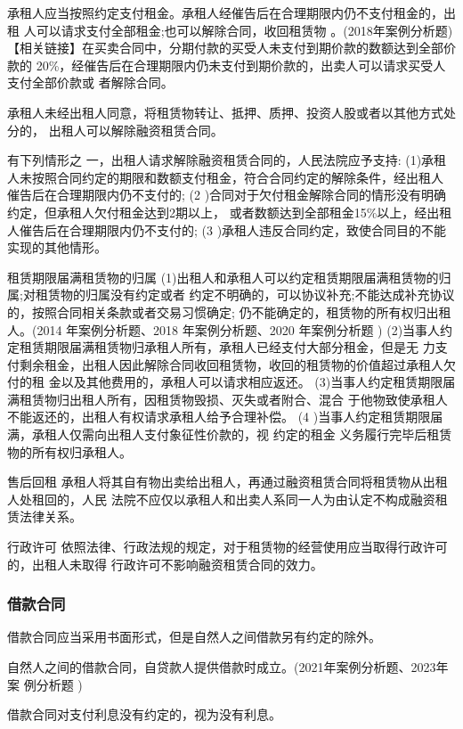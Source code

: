 \documentclass[UTF8,12pt]{ctexart}
\numberwithin{equation}{section} %
\numberwithin{figure}{section}
\numberwithin{table}{section}
\begin{document}
	承租人应当按照约定支付租金。承租人经催告后在合理期限内仍不支付租金的，出租 人可以请求支付全部租金;也可以解除合同，收回租赁物 。(2018年案例分析题)
	【相关链接】在买卖合同中，分期付款的买受人未支付到期价款的数额达到全部价款的 20\%，经催告后在合理期限内仍未支付到期价款的，出卖人可以请求买受人支付全部价款或 者解除合同。
	
	
	承租人未经出租人同意，将租赁物转让、抵押、质押、投资人股或者以其他方式处分的， 出租人可以解除融资租赁合同。
	
	有下列情形之 一，出租人请求解除融资租赁合同的，人民法院应予支持: (1)承租人未按照合同约定的期限和数额支付租金，符合合同约定的解除条件，经出租人 催告后在合理期限内仍不支付的;
	(2 )合同对于欠付租金解除合同的情形没有明确约定，但承租人欠付租金达到2期以上， 或者数额达到全部租金15\%以上，经出租人催告后在合理期限内仍不支付的;
	(3 )承租人违反合同约定，致使合同目的不能实现的其他情形。
	
	
	租赁期限届满租赁物的归属
	(1)出租人和承租人可以约定租赁期限届满租赁物的归属;对租赁物的归属没有约定或者 约定不明确的，可以协议补充;不能达成补充协议的，按照合同相关条款或者交易习惯确定; 仍不能确定的，租赁物的所有权归出租人。(2014 年案例分析题、2018 年案例分析题、2020 年案例分析题 )
	(2)当事人约定租赁期限届满租赁物归承租人所有，承租人已经支付大部分租金，但是无 力支付剩余租金，出租人因此解除合同收回租赁物，收回的租赁物的价值超过承租人欠付的租 金以及其他费用的，承租人可以请求相应返还。 (3)当事人约定租赁期限届满租赁物归出租人所有，因租赁物毁损、灭失或者附合、混合 于他物致使承租人不能返还的，出租人有权请求承租人给予合理补偿。
	(4 )当事人约定租赁期限届满，承租人仅需向出租人支付象征性价款的，视 约定的租金 义务履行完毕后租赁物的所有权归承租人。
	
	售后回租 承租人将其自有物出卖给出租人，再通过融资租赁合同将租赁物从出租人处租回的，人民 法院不应仅以承租人和出卖人系同一人为由认定不构成融资租赁法律关系。
	
	行政许可 依照法律、行政法规的规定，对于租赁物的经营使用应当取得行政许可的，出租人未取得 行政许可不影响融资租赁合同的效力。
	
	\subsubsection{借款合同}
	
	借款合同应当采用书面形式，但是自然人之间借款另有约定的除外。
	
	自然人之间的借款合同，自贷款人提供借款时成立。(2021年案例分析题、2023年案 例分析题 )
	
	借款合同对支付利息没有约定的，视为没有利息。
	
\end{document}
